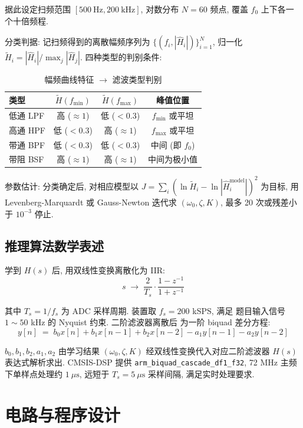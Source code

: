 \documentclass[a4paper]{article}
\begin{document}
据此设定扫频范围 $[500\ \mathrm{Hz}, 200\ \mathrm{kHz}]$, 对数分布
$N = 60$ 频点, 覆盖 $f_{0}$ 上下各一个十倍频程.

分类判据: 记扫频得到的离散幅频序列为
$\{(f_i, |\hat H_i|)\}_{i=1}^{N}$, 归一化
$\tilde H_i = |\hat H_i| / \max_j |\hat H_j|$. 四种类型的判别条件:

\begin{table}[H]
\centering
\caption{幅频曲线特征 $\to$ 滤波类型判别}
\begin{tabular}{lccc}
\toprule
类型 & $\tilde H(f_{\min})$ & $\tilde H(f_{\max})$ & 峰值位置 \\
\midrule
低通 LPF & 高 ($\approx 1$)  & 低 ($< 0.3$)     & $f_{\min}$ 或平坦 \\
高通 HPF & 低 ($< 0.3$)     & 高 ($\approx 1$) & $f_{\max}$ 或平坦 \\
带通 BPF & 低 ($< 0.3$)     & 低 ($< 0.3$)     & 中间 (即 $f_{0}$) \\
带阻 BSF & 高 ($\approx 1$)  & 高 ($\approx 1$) & 中间为极小值 \\
\bottomrule
\end{tabular}
\end{table}

参数估计: 分类确定后, 对相应模型以
$J = \sum_i (\ln \tilde H_i - \ln |\hat H_i^{\mathrm{model}}|)^{2}$
为目标, 用 Levenberg-Marquardt 或 Gauss-Newton 迭代求
$(\omega_{0}, \zeta, K)$, 最多 20 次或残差小于 $10^{-3}$ 停止.


\subsection{推理算法数学表述}

学到 $H(s)$ 后, 用双线性变换离散化为 IIR:
\[
s \;\to\; \frac{2}{T_s} \cdot \frac{1 - z^{-1}}{1 + z^{-1}}
\]

其中 $T_s = 1/f_s$ 为 ADC 采样周期. 装置取 $f_s = 200$ kSPS, 满足
题目输入信号 $1\!\sim\!50$ kHz 的 Nyquist 约束. 二阶滤波器离散后
为一阶 biquad 差分方程:
\[
y[n] \;=\;
b_{0}x[n] + b_{1}x[n-1] + b_{2}x[n-2]
- a_{1}y[n-1] - a_{2}y[n-2]
\]

$b_{0}, b_{1}, b_{2}, a_{1}, a_{2}$ 由学习结果 $(\omega_{0}, \zeta, K)$
经双线性变换代入对应二阶滤波器 $H(s)$ 表达式解析求出.
CMSIS-DSP 提供 \texttt{arm\_biquad\_cascade\_df1\_f32}, 72 MHz 主频
下单样点处理约 $1\ \mu\mathrm{s}$, 远短于 $T_s = 5\ \mu\mathrm{s}$
采样间隔, 满足实时处理要求.


\newpage
\section{电路与程序设计}
\end{document}
